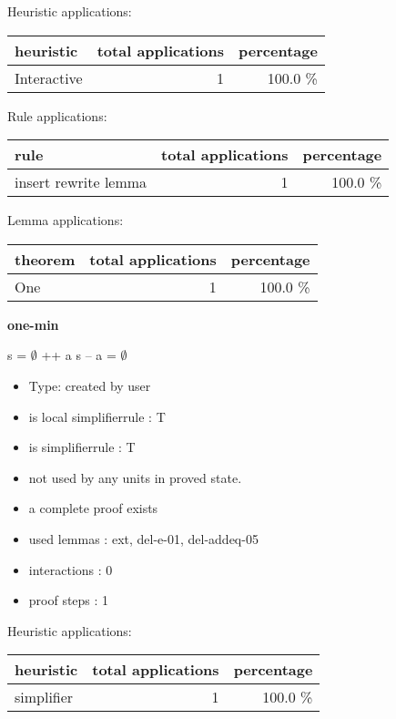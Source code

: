 \documentclass[a4paper]{article}
\begin{document}
\medskip


Heuristic applications:

\begin{supertabular}{l|r|r}
heuristic	& total applications & percentage \\ \hline
Interactive & 1 & 100.0 \% \\

\end{supertabular}

Rule applications:

\begin{supertabular}{l|r|r}
rule	        & total applications & percentage \\ \hline
insert rewrite lemma & 1 & 100.0 \% \\

\end{supertabular}

Lemma applications:

\begin{supertabular}{l|r|r}
theorem	        & total applications & percentage \\ \hline
One & 1 & 100.0 \% \\

\end{supertabular}
\pagebreak

{\LARGE\bf one-min}\label{lemma-one-min}

\medskip

 \Fol s = $\emptyset$ ++ a \Imp s -- a = $\emptyset$

\begin{itemize}

\item Type: created by user

\item is local simplifierrule : T
\item is simplifierrule : T
\item not used by any units in proved state.
\item       a complete proof exists
\item       used lemmas  : ext, del-e-01, del-addeq-05
\item       interactions : 0
\item       proof steps  : 1
\end{itemize}

\medskip


Heuristic applications:

\begin{supertabular}{l|r|r}
heuristic	& total applications & percentage \\ \hline
simplifier & 1 & 100.0 \% \\

\end{supertabular}
\end{document}
